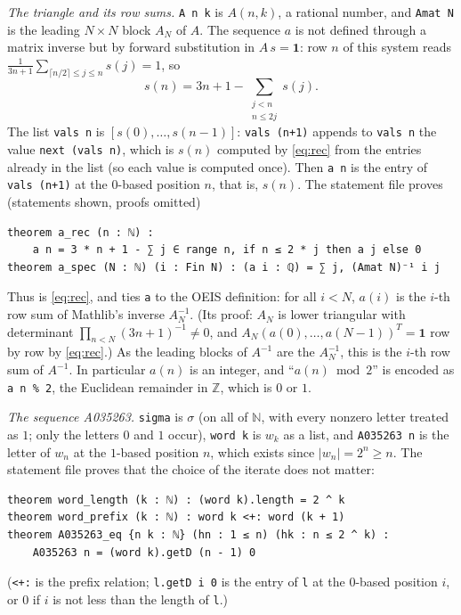 \documentclass[11pt]{amsart}
\theoremstyle{plain}
\theoremstyle{definition}
\newcommand{\N}{\mathbb{N}}
\newcommand{\Z}{\mathbb{Z}}
\begin{document}
\emph{The triangle and its row sums.} \texttt{A n k} is $A(n,k)$, a rational number, and \texttt{Amat N} is the leading $N\times N$ block $A_N$ of $A$. The sequence $a$ is not defined through a matrix inverse but by forward substitution in $A\,s=\mathbf1$: row $n$ of this system reads $\frac1{3n+1}\sum_{\lceil n/2\rceil\le j\le n}s(j)=1$, so
\begin{equation}\label{eq:rec}
  s(n)=3n+1-\sum_{\substack{j<n\\ n\le 2j}}s(j).
\end{equation}
The list \texttt{vals n} is $[s(0),\dots,s(n-1)]$: \texttt{vals (n+1)} appends to \texttt{vals n} the value \mbox{\texttt{next (vals n)}}, which is $s(n)$ computed by \eqref{eq:rec} from the entries already in the list (so each value is computed once). Then \texttt{a n} is the entry of \mbox{\texttt{vals (n+1)}} at the $0$-based position $n$, that is, $s(n)$. The statement file proves (statements shown, proofs omitted)
\begin{lstlisting}
theorem a_rec (n : ℕ) :
    a n = 3 * n + 1 - ∑ j ∈ range n, if n ≤ 2 * j then a j else 0
theorem a_spec (N : ℕ) (i : Fin N) : (a i : ℚ) = ∑ j, (Amat N)⁻¹ i j
\end{lstlisting}
Thus  is \eqref{eq:rec}, and  ties \texttt{a} to the OEIS definition: for all $i<N$, $a(i)$ is the $i$-th row sum of Mathlib's inverse $A_N^{-1}$. (Its proof: $A_N$ is lower triangular with determinant $\prod_{n<N}(3n+1)^{-1}\ne0$, and $A_N(a(0),\dots,a(N-1))^{T}=\mathbf1$ row by row by \eqref{eq:rec}.) As the leading blocks of $A^{-1}$ are the $A_N^{-1}$, this is the $i$-th row sum of $A^{-1}$. In particular $a(n)$ is an integer, and ``$a(n)\bmod 2$'' is encoded as \texttt{a n \% 2}, the Euclidean remainder in $\Z$, which is $0$ or $1$.

\emph{The sequence A035263.} \texttt{sigma} is $\sigma$ (on all of $\N$, with every nonzero letter treated as $1$; only the letters $0$ and $1$ occur), \texttt{word k} is $w_k$ as a list, and \texttt{A035263 n} is the letter of $w_n$ at the $1$-based position $n$, which exists since $|w_n|=2^n\ge n$. The statement file proves that the choice of the iterate does not matter:
\begin{lstlisting}
theorem word_length (k : ℕ) : (word k).length = 2 ^ k
theorem word_prefix (k : ℕ) : word k <+: word (k + 1)
theorem A035263_eq {n k : ℕ} (hn : 1 ≤ n) (hk : n ≤ 2 ^ k) :
    A035263 n = (word k).getD (n - 1) 0
\end{lstlisting}
(\texttt{<+:} is the prefix relation; \texttt{l.getD i 0} is the entry of \texttt{l} at the $0$-based position $i$, or $0$ if $i$ is not less than the length of \texttt{l}.)
\end{document}
